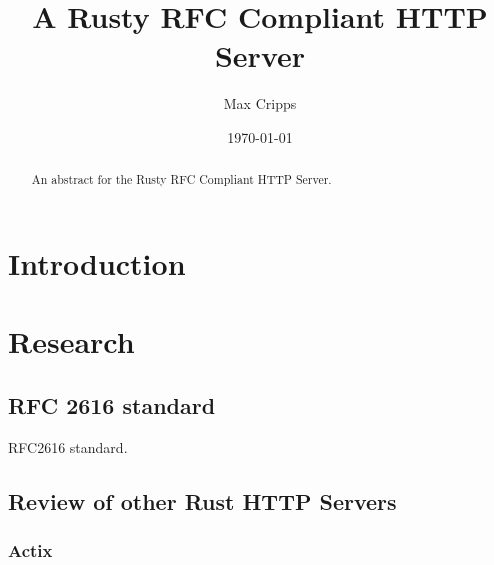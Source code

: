 \documentclass[12pt, a4paper]{article}
\title{A Rusty RFC Compliant HTTP Server}
\author{Max Cripps}
\date{\today}
\begin{document}
\maketitle 

\begin{abstract}
An abstract for the Rusty RFC Compliant HTTP Server.
\end{abstract}

\section{Introduction}


\section{Research}

\subsection{RFC 2616 standard}

RFC2616 standard.

\subsection{Review of other Rust HTTP Servers}

\subsubsection{Actix}

    
\end{document}
